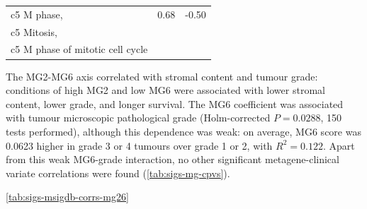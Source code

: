 \documentclass[dissertation.tex]{subfiles}
\begin{document}
\begin{table}[ht]
\begin{tabularx}{\textwidth}{ @{} X l l @{} }
  c5 M phase, & 0.68 & -0.50 \\ 
  c5 Mitosis, & & \\
  c5 M phase of mitotic cell cycle & & \\
   \bottomrule
\end{tabularx}
\end{table}

The MG2-MG6 axis correlated with stromal content and tumour grade: conditions of high MG2 and low MG6 were associated with lower stromal content, lower grade, and longer survival.  The MG6 coefficient was associated with tumour microscopic pathological grade (Holm-corrected $P = 0.0288$, 150 tests performed), although this dependence was weak: on average, MG6 score was 0.0623 higher in grade 3 or 4 tumours over grade 1 or 2, with $R^2 = 0.122$.  Apart from this weak MG6-grade interaction, no other significant metagene-clinical variate correlations were found (\cref{tab:sigs-mg-cpvs}).  

\cref{tab:sigs-msigdb-corrs-mg26}
\end{document}
